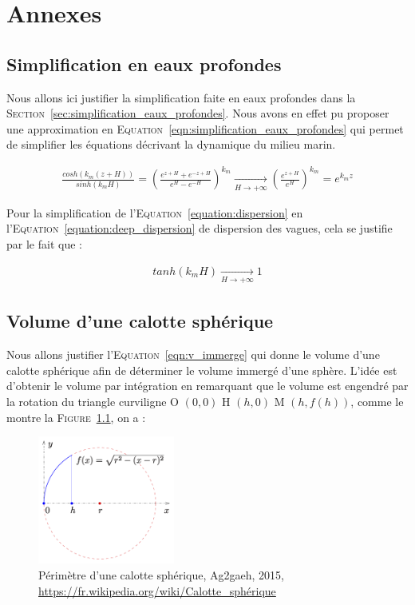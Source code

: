 \chapter{Annexes}
\label{annexe:gantt}

	\section{Simplification en eaux profondes}
	\label{annexe:deep_water}

		Nous allons ici justifier la simplification faite en eaux profondes dans la \textsc{Section}~\ref{sec:simplification_eaux_profondes}. Nous avons en effet pu proposer une approximation en \textsc{Equation}~\ref{eqn:simplification_eaux_profondes} qui permet de simplifier les équations décrivant la dynamique du milieu marin.

		\begin{eqnarray}
			\frac{cosh(k_m(z+H))}{sinh(k_mH)} = \left( \frac{e^{z+H} + e^{-z+H}}{e^{H}-e^{-H}} \right)^{k_m}  \xrightarrow[H \rightarrow + \infty]{}   \left( \frac{e^{z+H}}{e^{H}} \right)^{k_m} = e^{k_m z}
		\end{eqnarray}

		Pour la simplification de l'\textsc{Equation}~\ref{equation:dispersion} en l'\textsc{Equation}~\ref{equation:deep_dispersion} de dispersion des vagues, cela se justifie par le fait que :

		\begin{eqnarray}
			tanh(k_m H) \xrightarrow[H \rightarrow + \infty]{} 1
		\end{eqnarray}

	\section{Volume d'une calotte sphérique}
	\label{annexe:calotte_spherique}

		Nous allons justifier l'\textsc{Equation}~\ref{eqn:v_immerge} qui donne le volume d'une calotte sphérique afin de déterminer le volume immergé d'une sphère. L'idée est d'obtenir le volume par intégration en remarquant que le volume est engendré par la rotation du triangle curviligne O $(0, 0)$ H $(h, 0)$ M $(h, f(h))$, comme le montre la \textsc{Figure}~\ref{fig:calotte_spherique}, on a :

		\begin{figure}[!htb]
			\centering
			\includegraphics[width=0.4\textwidth]{imgs/calotte_spherique.png}
			\caption{Périmètre d'une calotte sphérique, Ag2gaeh, 2015, \url{https://fr.wikipedia.org/wiki/Calotte_sphérique}}
			\label{fig:calotte_spherique}
		\end{figure}

